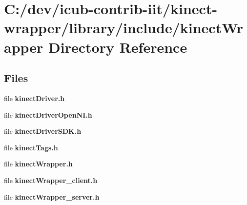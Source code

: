 \section{C\+:/dev/icub-\/contrib-\/iit/kinect-\/wrapper/library/include/kinect\+Wrapper Directory Reference}
\label{dir_1caf105552615038a067a5e0b3628349}
\subsection*{Files}
\begin{DoxyCompactItemize}
\item 
file {\bfseries kinect\+Driver.\+h}
\item 
file {\bfseries kinect\+Driver\+Open\+N\+I.\+h}
\item 
file {\bfseries kinect\+Driver\+S\+D\+K.\+h}
\item 
file {\bfseries kinect\+Tags.\+h}
\item 
file {\bfseries kinect\+Wrapper.\+h}
\item 
file {\bfseries kinect\+Wrapper\+\_\+client.\+h}
\item 
file {\bfseries kinect\+Wrapper\+\_\+server.\+h}
\end{DoxyCompactItemize}
